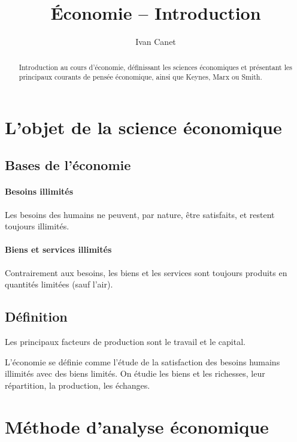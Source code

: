 \documentclass[10pt,a4paper,french]{article}
\begin{document}
\title{Économie -- Introduction}
\author{Ivan Canet}
\maketitle

\begin{abstract} %
Introduction au cours d'économie, définissant les sciences économiques et présentant les principaux courants de pensée économique, ainsi que Keynes, Marx ou Smith.
\end{abstract}

\tableofcontents

\section{L'objet de la science économique}

\subsection{Bases de l'économie}

\paragraph{Besoins illimités}
Les besoins des humains ne peuvent, par nature, être satisfaits, et restent toujours illimités.

\paragraph{Biens et services illimités}
Contrairement aux besoins, les biens et les services sont toujours produits en quantités limitées (sauf l'air).

\subsection{Définition}

Les principaux facteurs de production sont le travail et le capital.
\begin{cquote}{}
L'économie se définie comme l'étude de la satisfaction des besoins humains illimités avec des biens limités. On étudie les biens et les richesses, leur répartition, la production, les échanges.
\end{cquote}

\section{Méthode d'analyse économique}
\end{document}

